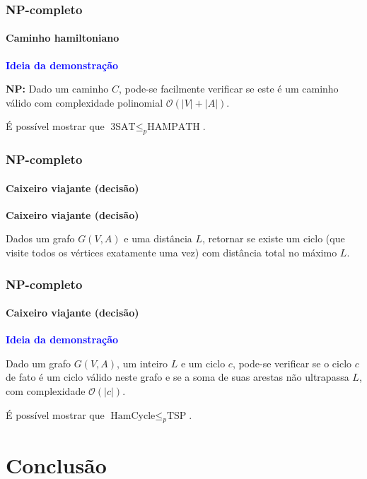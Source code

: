 \documentclass{beamer}
\begin{document}
\begin{frame}
\frametitle{NP-completo}
\framesubtitle{Caminho hamiltoniano}

\textcolor{blue}{\textbf{Ideia da demonstração}}

\textbf{NP: } Dado um caminho $C$, pode-se facilmente verificar se este é um caminho válido com complexidade polinomial $\mathcal{O}(|V| + |A|)$.

\bigskip

É possível mostrar que $\text{3SAT} \leq_p \text{HAMPATH}$.

\end{frame}

\begin{frame}
\frametitle{NP-completo}
\framesubtitle{Caixeiro viajante (decisão)}

\textcolor{blue(pigment)}{\textbf{Caixeiro viajante (decisão)}}

Dados um grafo $G(V, A)$ e uma distância $L$, retornar se existe um ciclo (que visite todos os vértices exatamente uma vez) com distância total no máximo $L$.
\end{frame}

\begin{frame}
\frametitle{NP-completo}
\framesubtitle{Caixeiro viajante (decisão)}

\textcolor{blue}{\textbf{Ideia da demonstração}}

Dado um grafo $G(V, A)$, um inteiro $L$ e um ciclo $c$, pode-se verificar se o ciclo $c$ de fato é um ciclo válido neste grafo e se a soma de suas arestas não ultrapassa $L$, com complexidade $\mathcal{O}(|c|)$.

\bigskip

É possível mostrar que $\text{HamCycle} \leq_p \text{TSP}$.

\end{frame}


\section{Conclusão}
\end{document}
